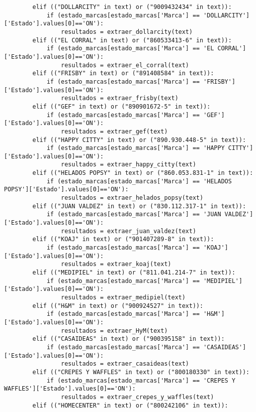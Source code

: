 \documentclass{article}
\begin{document}
\begin{lstlisting}
        elif (("DOLLARCITY" in text) or ("9009432434" in text)):
            if (estado_marcas[estado_marcas['Marca'] == 'DOLLARCITY']['Estado'].values[0]=='ON'):
                resultados = extraer_dollarcity(text)
        elif (("EL CORRAL" in text) or ("860533413-6" in text)): 
            if (estado_marcas[estado_marcas['Marca'] == 'EL CORRAL']['Estado'].values[0]=='ON'):
                resultados = extraer_el_corral(text)
        elif (("FRISBY" in text) or ("891408584" in text)):
            if (estado_marcas[estado_marcas['Marca'] == 'FRISBY']['Estado'].values[0]=='ON'):
                resultados = extraer_frisby(text)
        elif (("GEF" in text) or ("890901672-5" in text)):
            if (estado_marcas[estado_marcas['Marca'] == 'GEF']['Estado'].values[0]=='ON'):
                resultados = extraer_gef(text)
        elif (("HAPPY CITTY" in text) or ("890.930.448-5" in text)):
            if (estado_marcas[estado_marcas['Marca'] == 'HAPPY CITTY']['Estado'].values[0]=='ON'):
                resultados = extraer_happy_citty(text)
        elif (("HELADOS POPSY" in text) or ("860.053.831-1" in text)): 
            if (estado_marcas[estado_marcas['Marca'] == 'HELADOS POPSY']['Estado'].values[0]=='ON'):
                resultados = extraer_helados_popsy(text)
        elif (("JUAN VALDEZ" in text) or ("830.112.317-1" in text)):
            if (estado_marcas[estado_marcas['Marca'] == 'JUAN VALDEZ']['Estado'].values[0]=='ON'):
                resultados = extraer_juan_valdez(text)   
        elif (("KOAJ" in text) or ("901407289-8" in text)):
            if (estado_marcas[estado_marcas['Marca'] == 'KOAJ']['Estado'].values[0]=='ON'):
                resultados = extraer_koaj(text) 
        elif (("MEDIPIEL" in text) or ("811.041.214-7" in text)):
            if (estado_marcas[estado_marcas['Marca'] == 'MEDIPIEL']['Estado'].values[0]=='ON'):
                resultados = extraer_medipiel(text)
        elif (("H&M" in text) or ("900924527" in text)):
            if (estado_marcas[estado_marcas['Marca'] == 'H&M']['Estado'].values[0]=='ON'):
                resultados = extraer_HyM(text)
        elif (("CASAIDEAS" in text) or ("900395158" in text)):
            if (estado_marcas[estado_marcas['Marca'] == 'CASAIDEAS']['Estado'].values[0]=='ON'):
                resultados = extraer_casaideas(text)
        elif (("CREPES Y WAFFLES" in text) or ("800180330" in text)):
            if (estado_marcas[estado_marcas['Marca'] == 'CREPES Y WAFFLES']['Estado'].values[0]=='ON'):
                resultados = extraer_crepes_y_waffles(text)
        elif (("HOMECENTER" in text) or ("800242106" in text)):

\end{lstlisting}
\end{document}
